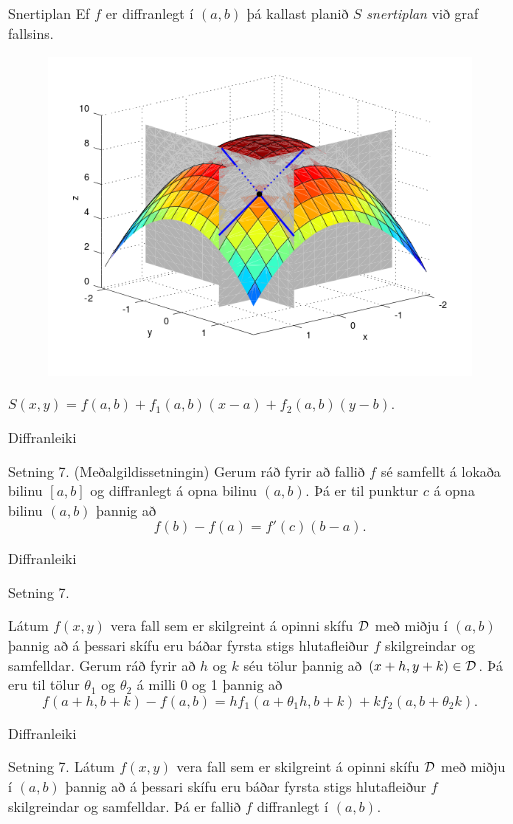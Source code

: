 \begin {frame}{Snertiplan}
  Ef $f$ er diffranlegt í $(a,b)$ þá kallast planið $S$ \emph{snertiplan} við graf fallsins.
  \begin{figure}
           \centering
            \includegraphics[width=0.6\linewidth]{bothpart.png}
    \end{figure}
    $S(x,y) = f(a,b) + f_1(a,b)(x-a)+f_2(a,b)(y-b)$.
\end {frame}


\begin{frame}{Diffranleiki} 

\begin {block}{Setning 7. (Meðalgildissetningin)}
Gerum ráð fyrir að fallið $f$
sé samfellt á lokaða bilinu $[a,b]$ og diffranlegt á opna bilinu
$(a,b)$.  Þá er til punktur $c$ á opna bilinu $(a,b)$ þannig að 
$$f(b)-f(a)=f'(c)(b-a).$$

\end{block}

\end{frame}

\begin{frame}{Diffranleiki} 

\begin {block}{Setning 7.}

Látum  $f(x,y)$ vera fall
sem er skilgreint á opinni 
skífu $\cal D$ með miðju í $(a,b)$ þannig að á þessari skífu eru báðar
fyrsta stigs hlutafleiður $f$ skilgreindar og samfelldar.  Gerum ráð fyrir að $h$
og $k$ séu tölur þannig að $(x+h, y+k)\in{\cal D}$.  Þá eru til tölur
$\theta_1$ og $\theta_2$ á milli 0 og 1 þannig að 
$$f(a+h,b+k)-f(a,b)=hf_1(a+\theta_1h,b+k)+kf_2(a,b+\theta_2k).$$
\end{block}

\end{frame}

\begin{frame}{Diffranleiki} 

\begin {block}{Setning 7.}
  Látum  $f(x,y)$ vera fall
sem er skilgreint á opinni 
skífu $\cal D$ með miðju í $(a,b)$ þannig að á þessari skífu eru báðar
fyrsta stigs hlutafleiður $f$ skilgreindar og samfelldar. 
Þá er fallið $f$ diffranlegt í $(a,b)$.
\end{block}

\end{frame}


